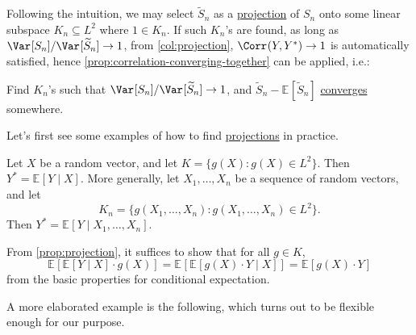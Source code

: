 Following the intuition, we may select \(\widetilde{S} _n\) as a \hyperref[def:projection]{projection} of \(S_n\) onto some linear subspace \(K_n \subseteq L^2\) where \(1 \in K_n\). If such \(K_n\)'s are found, as long as \(\Var_{}[S_n] / \Var_{}[\widetilde{S} _n] \to 1\), from \autoref{col:projection}, \(\Corr_{}(Y, Y^{\ast} ) \to 1\) is automatically satisfied, hence \autoref{prop:correlation-converging-together} can be applied, i.e.:

\begin{intuition}
	Find \(K_n\)'s such that \(\Var_{}[S_n] / \Var_{}[\widetilde{S} _n] \to 1\), and \(\widetilde{S} _n - \mathbb{E}_{}[\widetilde{S} _n] \) \hyperref[def:converge-in-distribution]{converges} somewhere.
\end{intuition}

Let's first see some examples of how to find \hyperref[def:projection]{projections} in practice.

\begin{eg}
	Let \(X\) be a random vector, and let \(K = \{ g(X) \colon g(X) \in L^2 \} \). Then \(Y^{\ast} = \mathbb{E}_{}[Y \mid X] \). More generally, let \(X_1, \dots , X_n\) be a sequence of random vectors, and let
	\[
		K_n = \{ g(X_1, \dots , X_n) \colon g(X_1, \dots , X_n) \in L^2\}.
	\]
	Then \(Y^{\ast} = \mathbb{E}_{}[Y \mid X_1, \dots , X_n] \).
\end{eg}
\begin{explanation}
	From \autoref{prop:projection}, it suffices to show that for all \(g \in K\),
	\[
		\mathbb{E}_{}[\mathbb{E}_{}[Y \mid X] \cdot g(X)]
		= \mathbb{E}_{}[\mathbb{E}_{}[g(X) \cdot Y \mid X] ]
		= \mathbb{E}_{}[g(X) \cdot Y]
	\]
	from the basic properties for conditional expectation.
\end{explanation}

A more elaborated example is the following, which turns out to be flexible enough for our purpose.

